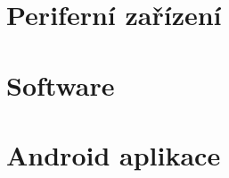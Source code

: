 \documentclass[czech,bachelor]{diploma}
\begin{document}


\chapter{Periferní zařízení}



\chapter{Software}



\chapter{Android aplikace}



\printbibliography[title={Literatura}, heading=bibintoc]
\end{document}
